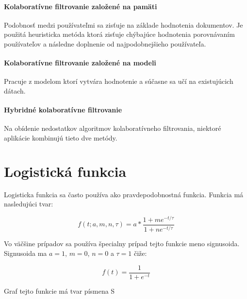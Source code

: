 \paragraph{Kolaboratívne filtrovanie založené na pamäti}

Podobnosť medzi používateľmi sa zisťuje na základe hodnotenia dokumentov. Je použitá heuristicka metóda ktorá zisťuje chýbajúce hodnotenia porovnávaním používateľov a následne doplnenie od najpodobnejšieho používateľa.

\paragraph{Kolaboratívne filtrovanie založené na modeli}

Pracuje z modelom ktorí vytvára hodnotenie a súčasne sa učí na existujúcich dátach.

\paragraph{Hybridné kolaboratívne filtrovanie}

Na obídenie nedostatkov algoritmov kolaboratívneho filtrovania, niektoré aplikácie kombinujú tieto dve metódy.

\section{Logistická funkcia}

Logisticka funkcia sa často používa ako pravdepodobnostná funkcia. Funkcia má nasledujúci tvar: 

\[f(t; a,m,n,\tau) = a*\frac{1 + me^{-t/\tau}}{1 + ne^{-t/\tau}}\]

Vo väčšine prípadov sa používa špecialny prípad tejto funkcie meno signusoida.
Signusoida ma $a = 1$, $m = 0$, $n = 0$ a $\tau = 1$ čiže:

\[f(t) = \frac{1}{1 + e^{-t}}\]

Graf tejto funkcie má tvar písmena S


